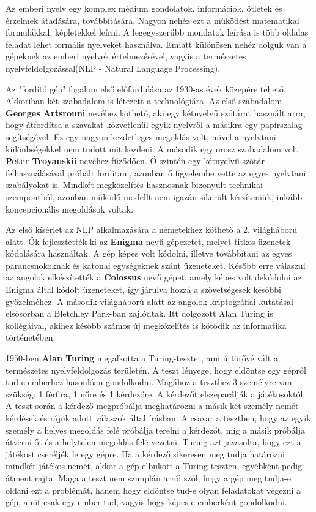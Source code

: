 

Az emberi nyelv egy komplex médium gondolatok, információk, ötletek és érzelmek átadására, továbbítására. Nagyon nehéz ezt a működést matematikai formulákkal, képletekkel leírni. A legegyszerűbb mondatok leírása is több oldalas feladat lehet formális nyelveket használva. Emiatt különösen nehéz dolguk van a gépeknek az emberi nyelvek értelmezésével, vagyis a természetes nyelvfeldolgozással(NLP - Natural Language Processing).

Az "fordító gép" fogalom első előfordulása az 1930-as évek közepére tehető. Akkoriban két szabadalom is létezett a technológiára. Az első szabadalom \textbf{Georges Artsrouni} nevéhez köthető, aki egy kétnyelvű szótárat használt arra, hogy átfordítsa a szavakat közvetlenül egyik nyelvről a másikra egy papírszalag segítségével. Ez egy nagyon kezdetleges megoldás volt, mivel a nyelvtani különbségekkel nem tudott mit kezdeni. A második egy orosz szabadalom volt \textbf{Peter Troyanskii} nevéhez fűződően. Ő szintén egy kétnyelvű szótár felhasználásával próbált fordítani, azonban ő figyelembe vette az egyes nyelvtani szabályokat is. Mindkét megközelítés hasznosnak bizonyult technikai szempontból, azonban működő modellt nem igazán sikerült készíteniük, inkább koncepcionális megoldások voltak.

Az első kísérlet az NLP alkalmazására a németekhez köthető a 2. világháború alatt. Ők fejlesztették ki az \textbf{Enigma} nevű gépezetet, melyet titkos üzenetek kódolására használtak. A gép képes volt kódolni, illetve továbbítani az egyes parancsnokoknak és katonai egységeknek szánt üzeneteket. Később erre válaszul az angolok elkészítették a \textbf{Colossus} nevű gépet, amely képes volt dekódolni az Enigma által kódolt üzeneteket, így járulva hozzá a szövetségesek későbbi győzelméhez.
A második világháború alatt az angolok kriptográfiai kutatásai elsősorban a Bletchley Park-ban zajlódtak. Itt dolgozott Alan Turing is kollégáival, akihez később számos új megközelítés is kötődik az informatika történetében.

1950-ben \textbf{Alan Turing} megalkotta a Turing-tesztet, ami úttörővé vált a természetes nyelvfeldolgozás területén. A teszt lényege, hogy eldöntse egy gépről tud-e emberhez hasonlóan gondolkodni. Magához a teszthez 3 személyre van szükség: 1 férfira, 1 nőre és 1 kérdezőre. A kérdezőt elszeparálják a játékosoktól. A teszt során a kérdező megpróbálja meghatározni a másik két személy nemét kérdések és rájuk adott válaszok által írásban. A csavar a tesztben, hogy az egyik személy a helyes megoldás felé próbálja terelni a kérdezőt, míg a másik próbálja átverni őt és a helytelen megoldás felé vezetni. Turing azt javasolta, hogy ezt a játékost cseréljék le egy gépre. Ha a kérdező sikeresen meg tudja határozni mindkét játékos nemét, akkor a gép elbukott a Turing-teszten, egyébként pedig átment rajta. Maga a teszt nem szimplán arról szól, hogy a gép meg tudja-e oldani ezt a problémát, hanem hogy eldöntse tud-e olyan feladatokat végezni a gép, amit csak egy ember tud, vagyis hogy képes-e emberként gondolkodni.

